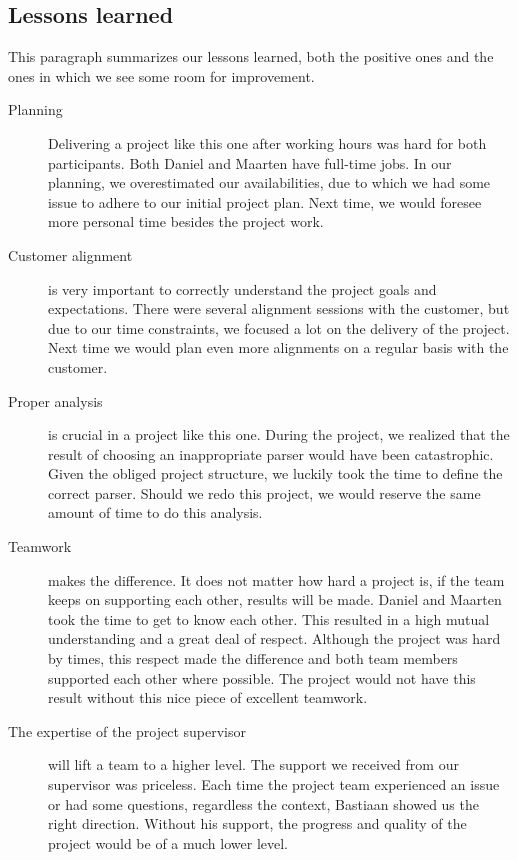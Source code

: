 
\subsection{Lessons learned}
\label{assessment:lessons-learned}
This paragraph summarizes our lessons learned, both the positive ones and the ones in which we see some room for improvement.

  \begin{description}
    \item[Planning] Delivering a project like this one after working hours was hard for both participants. 
	  Both Daniel and Maarten have full-time jobs.
	  In our planning, we overestimated our availabilities, due to which we had some issue to adhere to our initial project plan.
	  Next time, we would foresee more personal time besides the project work.
	
    \item[Customer alignment] is very important to correctly understand the project goals and expectations.
	  There were several alignment sessions with the customer, but due to our time constraints, we focused a lot on the delivery of the project. 
	  Next time we would plan even more alignments on a regular basis with the customer.	  
    
    \item[Proper analysis] is crucial in a project like this one.
	  During the project, we realized that the result of choosing an inappropriate parser would have been catastrophic.
	  Given the obliged project structure, we luckily took the time to define the correct parser.
      Should we redo this project, we would reserve the same amount of time to do this analysis.
    
    \item[Teamwork] makes the difference.
	  It does not matter how hard a project is, if the team keeps on supporting each other, results will be made.
	  Daniel and Maarten took the time to get to know each other.
	  This resulted in a high mutual understanding and a great deal of respect.
	  Although the project was hard by times, this respect made the difference and both team members supported each other where possible.
	  The project would not have this result without this nice piece of excellent teamwork.
	 
	 \item[The expertise of the project supervisor] will lift a team to a higher level.
	  The support we received from our supervisor was priceless.
	  Each time the project team experienced an issue or had some questions, regardless the context, Bastiaan showed us the right direction.
	  Without his support, the progress and quality of the project would be of a much lower level.
  \end{description}
